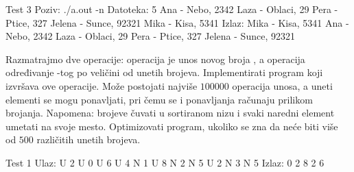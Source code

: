 \begin{Exercise}[label=514]
\begin{miditest}
\begin{test}{Test 3}
Poziv: ./a.out -n
Datoteka:  5
           Ana - Nebo, 2342
           Laza - Oblaci, 29
           Pera - Ptice, 327
           Jelena - Sunce, 92321
           Mika - Kisa, 5341
Izlaz:     Mika - Kisa, 5341
           Ana - Nebo, 2342
           Laza - Oblaci, 29
           Pera - Ptice, 327
           Jelena - Sunce, 92321		   
\end{test}
\end{miditest}

\end{Exercise}

\begin{Answer}[ref=514]
\end{Answer}
\begin{Exercise}[difficulty=2, label=515]
  Razmatrajmo dve operacije: operacija  je unos novog broja
  , a operacija  određivanje -tog po
  veličini od unetih brojeva. Implementirati program koji izvršava ove
  operacije. Može postojati najviše $100000$ operacija unosa, a uneti
  elementi se mogu ponavljati, pri čemu se i ponavljanja računaju
  prilikom brojanja. Napomena: brojeve čuvati u sortiranom nizu i
  svaki naredni element umetati na svoje mesto. Optimizovati program,
  ukoliko se zna da neće biti više od $500$ različitih unetih brojeva.
  
\begin{maxitest}
\begin{test}{Test 1}
Ulaz: U 2 U 0 U 6 U 4 N 1 U 8 N 2 N 5 U 2 N 3 N 5
Izlaz: 0 2 8 2 6
\end{test}
\end{maxitest}
  
\end{Exercise}

